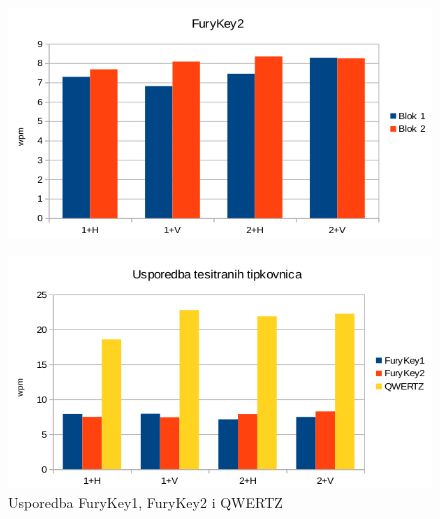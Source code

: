 \documentclass[times, utf8, zavrsni, numeric]{fer}
\begin{document}
\begin{appendices}
\begin{figure}[htb]
\centering
\includegraphics[width=12cm]{img/furykey2_sve_graf.png}
\label{chart:furykey2_sve_graf}
\end{figure}

\begin{figure}[htb]
\centering
\includegraphics[width=12cm]{img/usporedba.png}
\caption{Usporedba FuryKey1, FuryKey2 i QWERTZ}
\label{chart:usporedba}
\end{figure}


\end{appendices}
\end{document}
